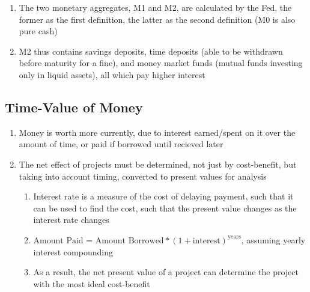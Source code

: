 \documentclass[11 pt, twoside]{article}
\begin{document}
\begin{enumerate}
\begin{enumerate}
\item The two monetary aggregates, M1 and M2, are calculated by the Fed, the former as the first definition, the latter as the second definition (M0 is also pure cash)
\item M2 thus contains savings deposits, time deposits (able to be withdrawn before maturity for a fine), and money market funds (mutual funds investing only in liquid assets), all which pay higher interest
\end{enumerate}
\end{enumerate}

\subsection{Time-Value of Money}
\begin{enumerate}
\item Money is worth more currently, due to interest earned/spent on it over the amount of time, or paid if borrowed until recieved later
\item The net effect of projects must be determined, not just by cost-benefit, but taking into account timing, converted to present values for analysis
\begin{enumerate}
\item Interest rate is a measure of the cost of delaying payment, such that it can be used to find the cost, such that the present value changes as the interest rate changes
\item $\text{Amount Paid = Amount Borrowed} * (1 + \text{interest})^\text{years}$, assuming yearly interest compounding
\item As a result, the net present value of a project can determine the project with the most ideal cost-benefit
\end{enumerate}
\end{enumerate}
\end{document}
